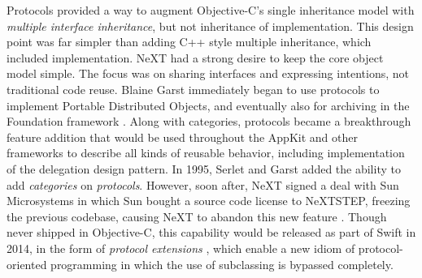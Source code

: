 \documentclass[acmsmall]{acmart}\settopmatter{}
\begin{document}
Protocols provided a way to augment Objective-C's single inheritance model with \emph{multiple interface inheritance}, but not inheritance of implementation. This design point was far simpler than adding C++ style multiple inheritance, which included implementation. NeXT had a strong desire to keep the core object model simple. The focus was on sharing interfaces and expressing intentions, not traditional code reuse. Blaine Garst immediately began to use protocols to implement Portable Distributed Objects, and eventually also for archiving in the Foundation framework \citep[54--55]{garst_oral_2016}. Along with categories, protocols became a breakthrough feature addition that would be used throughout the AppKit and other frameworks to describe all kinds of reusable behavior, including implementation of the delegation design pattern. In 1995, Serlet and Garst added the ability to add \emph{categories} on \emph{protocols}. However, soon after, NeXT signed a deal with Sun Microsystems in which Sun bought a source code license to NeXTSTEP, freezing the previous codebase, causing NeXT to abandon this new feature \citep[60--61]{garst_oral_2016}. Though never shipped in Objective-C, this capability would be released as part of Swift in 2014, in the form of \emph{protocol extensions} , which enable a new idiom of protocol-oriented programming in which the use of subclassing is bypassed completely.
\end{document}
